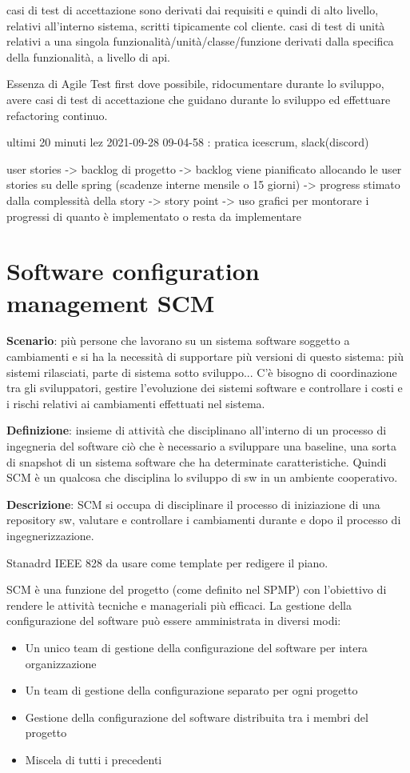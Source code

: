 \documentclass[10pt,a4paper]{book}
\begin{document}
casi di test di accettazione sono derivati dai requisiti e quindi di alto livello, relativi all'interno sistema, scritti tipicamente col cliente.
casi di test di unità relativi a una singola funzionalità/unità/classe/funzione derivati dalla specifica della funzionalità, a livello di api.


Essenza di Agile
Test first dove possibile, ridocumentare durante lo sviluppo, avere casi di test di accettazione che guidano durante lo sviluppo ed effettuare refactoring continuo.



ultimi 20 minuti lez 2021-09-28 09-04-58 : pratica icescrum, slack(discord)

user stories -> backlog di progetto -> backlog viene pianificato allocando le user stories su delle spring (scadenze interne mensile o 15 giorni) -> progress stimato dalla complessità della story -> story point -> uso grafici per montorare i progressi di quanto è implementato o resta da implementare

\newpage
\chapter{Software configuration management SCM}
\textbf{Scenario}: più persone che lavorano su un sistema software soggetto a cambiamenti e si ha la necessità di supportare più versioni di questo sistema: più sistemi rilasciati, parte di sistema sotto sviluppo...
C'è bisogno di coordinazione tra gli sviluppatori, gestire l'evoluzione dei sistemi software e controllare i costi e i rischi relativi ai cambiamenti effettuati nel sistema.

\textbf{Definizione}: insieme di attività che disciplinano all'interno di un processo di ingegneria del software ciò che è necessario a sviluppare una baseline, una sorta di snapshot di un sistema software che ha determinate caratteristiche. Quindi SCM è un qualcosa che disciplina lo sviluppo di sw in un ambiente cooperativo.

\textbf{Descrizione}: SCM si occupa di disciplinare il processo di iniziazione di una repository sw, valutare e controllare i cambiamenti durante e dopo il processo di ingegnerizzazione.

Stanadrd IEEE 828 da usare come template per redigere il piano.

SCM è una funzione del progetto (come definito nel SPMP) con l'obiettivo di rendere le attività tecniche e manageriali più efficaci.
La gestione della configurazione del software può essere amministrata in diversi modi:
\begin{itemize}
\item Un unico team di gestione della configurazione del software per intera organizzazione
\item Un team di gestione della configurazione separato per ogni progetto
\item Gestione della configurazione del software distribuita tra i membri del progetto
\item Miscela di tutti i precedenti
\end{itemize}
\end{document}
